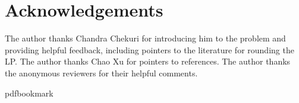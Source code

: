 \documentclass[11pt]{article}
\numberwithin{equation}{section}
\theoremstyle{definition}
\theoremstyle{plain}
\begin{document}
\section*{Acknowledgements}
The author thanks Chandra Chekuri for introducing him to the problem
and providing helpful feedback, including pointers to the literature
for rounding the LP. The author thanks Chao Xu for pointers to
references. The author thanks the anonymous reviewers for their
helpful comments.

%

%

%
%
%

%

\newcommand{\prelim}{Preliminary version in\ }\newcommand{\prelims}{Preliminary
  versions in\ }
\providecommand{\bibhead}[1]{}
\expandafter\ifx\csname pdfbookmark\endcsname\relax%
  \providecommand{\tocrefpdfbookmark}{}
\else\providecommand{\tocrefpdfbookmark}{%
   \hypertarget{tocreferences}{}%
   \pdfbookmark[1]{References}{tocreferences}}%
\fi
\end{document}
